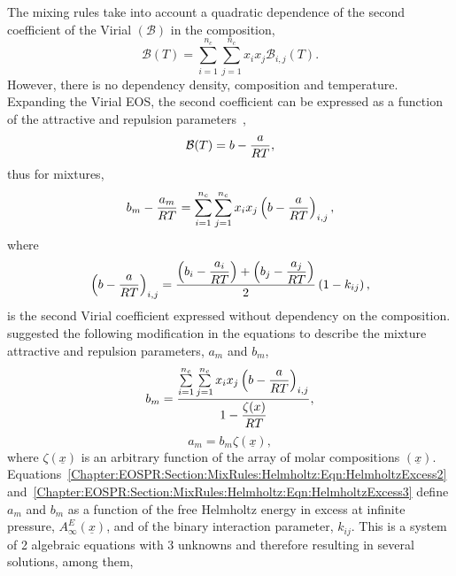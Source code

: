 The mixing rules take into account a quadratic dependence of the second coefficient of the Virial $\left(\mathcal{B}\right)$ in the composition,
   \begin{equation}
      \mathcal{B}(T) = \sum\limits_{i=1}^{n_{c}}\sum\limits_{j=1}^{n_{c}}x_{i}x_{j}\mathcal{B}_{i,j}(T).
   \end{equation}
However, there is no dependency \wrt density, composition and temperature. Expanding the Virial EOS, the second coefficient can be expressed as a function of the attractive and repulsion parameters~\citep[see][]{Vidal_Book},
   \begin{displaymath}
      \mathcal{B}(T) = b- \displaystyle\frac{a}{RT},
   \end{displaymath}
thus for mixtures,
   \begin{equation}
      b_{m} - \displaystyle\frac{a_{m}}{RT} = \sum\limits_{i=1}^{n_{c}}\sum\limits_{j=1}^{n_{c}}x_{i}x_{j}\left(b-\displaystyle\frac{a}{RT}\right)_{i,j},\label{Chapter:EOSPR:Section:MixRules:Helmholtz:Eqn:HelmholtzExcess3}
   \end{equation}
where
   \begin{displaymath}
      \left(b-\displaystyle\frac{a}{RT}\right)_{i,j} = \displaystyle\frac{\left(b_{i} - \displaystyle\frac{a_{i}}{RT}\right) + \left(b_{j} - \displaystyle\frac{a_{j}}{RT}\right)}{2}\left(1-k_{ij}\right),
   \end{displaymath}
is the second Virial coefficient expressed without dependency on the composition. \citet{wong_1992} suggested the following modification in the equations to describe the mixture attractive and repulsion parameters, $a_{m}$ and $b_{m}$,
   \begin{equation}
     b_{m} = \displaystyle\frac{\sum\limits_{i=1}^{n_{c}}\sum\limits_{j=1}^{n_{c}}x_{i}x_{j}\left(b-\displaystyle\frac{a}{RT}\right)_{i,j}}{1 - \displaystyle\frac{\zeta(x)}{RT}},\label{Chapter:EOSPR:Section:MixRules:Helmholtz:Eqn:HelmholtzExcess4}
   \end{equation}
   \begin{equation}
     a_{m} = b_{m}\zeta\left(\underline{x}\right),\label{Chapter:EOSPR:Section:MixRules:Helmholtz:Eqn:HelmholtzExcess5}
   \end{equation}
where $\zeta\left(\underline{x}\right)$ is an arbitrary function of the array of molar compositions $\left(\underline{x}\right)$. Equations~\ref{Chapter:EOSPR:Section:MixRules:Helmholtz:Eqn:HelmholtzExcess2} and~\ref{Chapter:EOSPR:Section:MixRules:Helmholtz:Eqn:HelmholtzExcess3} define $a_{m}$ and $b_{m}$ as a function of the free Helmholtz energy in excess at infinite pressure, $A_{\infty}^{E}\left(\underline{x}\right)$, and of the binary interaction parameter, $k_{ij}$. This is a system of 2 algebraic equations with 3 unknowns and therefore resulting in several solutions, among them,
